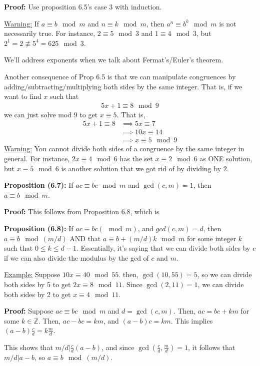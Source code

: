 \documentclass{article}
\newcommand*{\zz}{\mathbb{Z}}%
\begin{document}
\textbf{Proof:} Use proposition 6.5's case 3 with induction. 

\underline{Warning:} If $a\equiv b\mod m$ and $n\equiv k\mod m$, then $a^n\equiv b^k\mod m$ is not necessarily true. For instance, $2\equiv 5\mod 3$ and $1\equiv 4\mod 3$, but $2^1=2\not\equiv 5^4=625\mod 3$.

We'll address exponents when we talk about Fermat's/Euler's theorem.

Another consequence of Prop 6.5 is that we can manipulate congruences by adding/subtracting/multiplying both sides by the same integer. That is, if we want to find $x$ such that \begin{align*}
    5x+1\equiv 8\mod 9
\end{align*}we can just solve mod 9 to get $x\equiv 5$. That is, \begin{align*}
    5x+1\equiv 8&\implies 5x\equiv 7\\
    &\implies 10x\equiv 14 \\
    &\implies x\equiv 5\mod 9
\end{align*}
\underline{Warning:} You cannot divide both sides of a congruence by the same integer in general. For instance, $2x\equiv 4\mod 6$ has the set $x\equiv 2\mod 6$ as ONE solution, but $x\equiv 5\mod 6$ is another solution that we got rid of by dividing by 2.

\textbf{Proposition (6.7):} If $ac\equiv bc\mod m$ and $\gcd(c,m)=1$, then $a\equiv b\mod m$. 

\textbf{Proof:} This follows from Proposition 6.8, which is

\textbf{Proposition (6.8):} If $ac\equiv bc(\mod m)$, and $gcd(c,m)=d$, then $a\equiv b\mod (m/d)$ AND that $a\equiv b+(m/d)k\mod m$ for some integer $k$ such that $0\leq k\leq d-1$. Essentially, it's saying that we can divide both sides by $c$ if we can also divide the modulus by the gcd of $c$ and $m$.

\underline{Example:} Suppose $10x\equiv 40\mod 55$. then, $\gcd(10,55)=5$, so we can divide both sides by 5 to get $2x\equiv 8\mod 11$. Since $\gcd(2,11)=1$, we can divide both sides by 2 to get $x\equiv 4\mod 11$.

\textbf{Proof:} Suppose $ac\equiv bc\mod m$ and $d=\gcd(c,m)$. Then, $ac=bc+km$ for some $k\in \zz$. Then, $ac-bc=km$, and $(a-b)c=km$. This implies $(a-b)\frac{c}{d}=k\frac{m}{d}$.

This shows that $m/d|\frac{c}{d}(a-b)$, and since $\gcd(\frac{c}{d}, \frac{m}{d})=1$, it follows that $m/d|a-b$, so $a\equiv b\mod (m/d)$.
\end{document}

